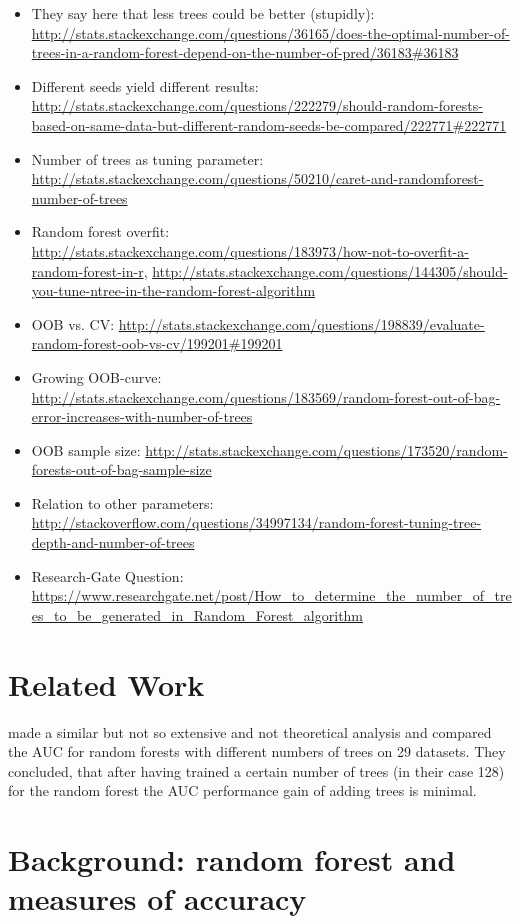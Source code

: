 \documentclass[paper=a4
               ,12pt
               ,DIV=12
               ,parskip=half
               ,titlepage=on
               ,headinclude 
               ,footinclude
               ,headsepline
               ,footsepline         %
               ,ilines 
               ]{scrartcl}
\begin{document}
\begin{itemize}
\begin{itemize}
\item They say here that less trees could be better (stupidly): \url{http://stats.stackexchange.com/questions/36165/does-the-optimal-number-of-trees-in-a-random-forest-depend-on-the-number-of-pred/36183#36183}
\item Different seeds yield different results: \url{http://stats.stackexchange.com/questions/222279/should-random-forests-based-on-same-data-but-different-random-seeds-be-compared/222771#222771}
\item Number of trees as tuning parameter: \url{http://stats.stackexchange.com/questions/50210/caret-and-randomforest-number-of-trees}
\item Random forest overfit: \url{http://stats.stackexchange.com/questions/183973/how-not-to-overfit-a-random-forest-in-r}, \url{http://stats.stackexchange.com/questions/144305/should-you-tune-ntree-in-the-random-forest-algorithm}
\item OOB vs. CV: \url{http://stats.stackexchange.com/questions/198839/evaluate-random-forest-oob-vs-cv/199201#199201}
\item Growing OOB-curve: \url{http://stats.stackexchange.com/questions/183569/random-forest-out-of-bag-error-increases-with-number-of-trees}
\item OOB sample size: \url{http://stats.stackexchange.com/questions/173520/random-forests-out-of-bag-sample-size}
\item Relation to other parameters: \url{http://stackoverflow.com/questions/34997134/random-forest-tuning-tree-depth-and-number-of-trees}
\item Research-Gate Question: \url{https://www.researchgate.net/post/How_to_determine_the_number_of_trees_to_be_generated_in_Random_Forest_algorithm}
\end{itemize}
\end{itemize}

\section{Related Work}
\citet{Oshiro2012} made a similar but not so extensive and not theoretical analysis and compared the AUC for random forests with different numbers of trees on 29 datasets. 
They concluded, that after having trained a certain number of trees (in their case 128) for the random forest the AUC performance gain of adding trees is minimal. 

\section{Background: random forest and measures of accuracy}
\end{document}
